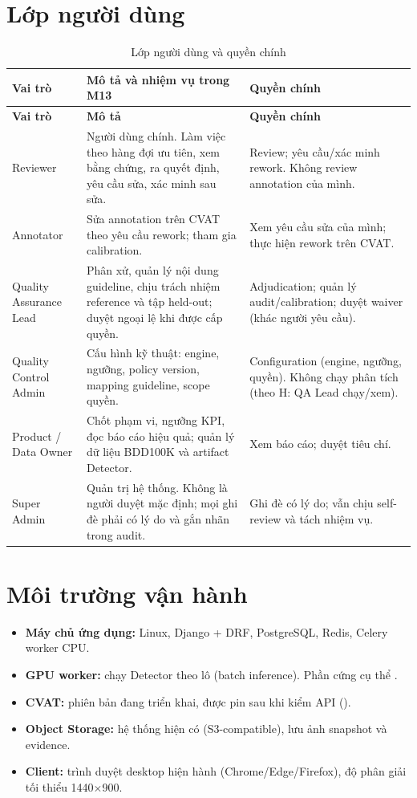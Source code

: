 \section{Lớp người dùng}
\label{sec:users}
\begin{xltabular}{\linewidth}{@{}L{3cm}Y L{3.6cm}@{}}
\caption{Lớp người dùng và quyền chính}\label{tab:users}\\
\toprule
\textbf{Vai trò} & \textbf{Mô tả và nhiệm vụ trong M13} & \textbf{Quyền chính}\\
\midrule
\endfirsthead
\toprule \textbf{Vai trò} & \textbf{Mô tả} & \textbf{Quyền chính}\\ \midrule
\endhead
\bottomrule
\endfoot
Reviewer & Người dùng chính. Làm việc theo hàng đợi ưu tiên, xem bằng chứng, ra quyết định, yêu cầu sửa, xác minh sau sửa. & Review; yêu cầu/xác minh rework. Không review annotation của mình.\\
Annotator & Sửa annotation trên CVAT theo yêu cầu rework; tham gia calibration. & Xem yêu cầu sửa của mình; thực hiện rework trên CVAT.\\
Quality Assurance Lead & Phân xử, quản lý nội dung guideline, chịu trách nhiệm reference và tập held-out; duyệt ngoại lệ khi được cấp quyền. & Adjudication; quản lý audit/calibration; duyệt waiver (khác người yêu cầu).\\
Quality Control Admin & Cấu hình kỹ thuật: engine, ngưỡng, policy version, mapping guideline, scope quyền. & Configuration (engine, ngưỡng, quyền). Không chạy phân tích (theo H: QA Lead chạy/xem).\\
Product / Data Owner & Chốt phạm vi, ngưỡng KPI, đọc báo cáo hiệu quả; quản lý dữ liệu BDD100K và artifact Detector. & Xem báo cáo; duyệt tiêu chí.\\
Super Admin & Quản trị hệ thống. Không là người duyệt mặc định; mọi ghi đè phải có lý do và gắn nhãn trong audit. & Ghi đè có lý do; vẫn chịu self-review và tách nhiệm vụ.\\
\end{xltabular}

\section{Môi trường vận hành}
\begin{itemize}
  \item \textbf{Máy chủ ứng dụng:} Linux, Django + DRF, PostgreSQL, Redis, Celery worker CPU.
  \item \textbf{GPU worker:} chạy Detector theo lô (batch inference). Phần cứng cụ thể \TBD[-02].
  \item \textbf{CVAT:} phiên bản đang triển khai, được pin sau khi kiểm API (\TBD[-01]).
  \item \textbf{Object Storage:} hệ thống hiện có (S3-compatible), lưu ảnh snapshot và evidence.
  \item \textbf{Client:} trình duyệt desktop hiện hành (Chrome/Edge/Firefox), độ phân giải tối thiểu 1440$\times$900.
\end{itemize}

